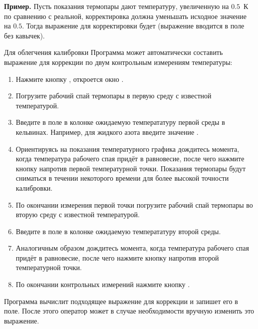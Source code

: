 {\bf Пример. } Пусть показания термопары дают температуру, увеличенную на $0.5$~К по сравнению с реальной, корректировка должна уменьшать исходное значение на $0.5$. Тогда выражение для корректировки будет \mbox{} (выражение вводится в поле без кавычек).

\bigskip

Для облегчения калибровки Программа может автоматически составить выражение для коррекции по двум контрольным измерениям температуры:

\begin{enumerate}
\item Нажмите кнопку , откроется окно .
\item Погрузите рабочий спай термопары в первую среду с известной температурой.
\item Введите в поле  в колонке  ожидаемую температатуру первой среды в кельвинах. Например, для жидкого азота введите значение .
\item Ориентируясь на показания температурного графика дождитесь момента, когда температура рабочего спая придёт в равновесие, после чего нажмите кнопку  напротив первой температурной точки. Показания термопары будут сниматься в течении некоторого времени для более высокой точности калибровки.
\item По окончании измерения первой точки погрузите рабочий спай термопары во вторую среду с известной температурой.
\item Введите в поле  в колонке  ожидаемую температатуру второй среды.
\item Аналогичным образом дождитесь момента, когда температура рабочего спая придёт в равновесие, после чего нажмите кнопку  напротив второй температурной точки.
\item По окончании контрольных измерений нажмите кнопку .
\end{enumerate}

Программа вычислит подходящее выражение для коррекции и запишет его в поле. После этого оператор может в случае необходимости вручную изменить это выражение.